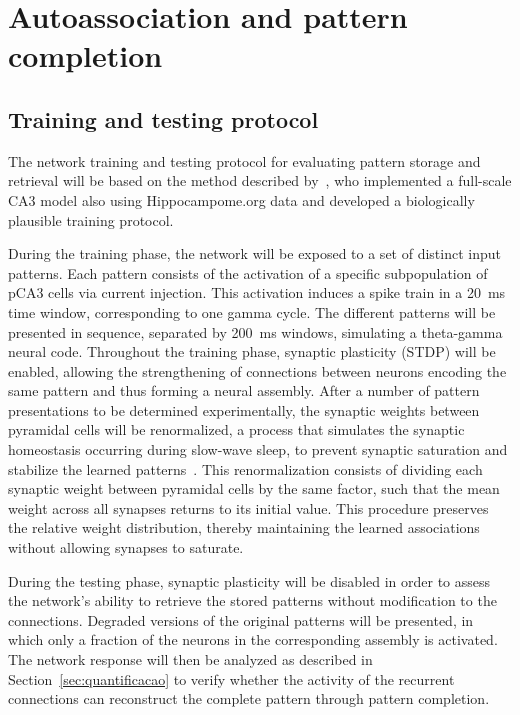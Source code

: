 \section{Autoassociation and pattern completion}

\subsection{Training and testing protocol}\label{sec:protocolo_treinamento_teste}

The network training and testing protocol for evaluating pattern storage and retrieval will be based on the method described
by~\textcite{kopsickFormation2024}, who implemented a full-scale CA3 model also using Hippocampome.org data and developed a
biologically plausible training protocol.

During the training phase, the network will be exposed to a set of distinct input patterns. Each pattern consists of the
activation of a specific subpopulation of pCA3 cells via current injection. This activation induces a spike train in a
\SI{20}{\milli\second} time window, corresponding to one gamma cycle. The different patterns will be presented in sequence,
separated by \SI{200}{\milli\second} windows, simulating a theta-gamma neural code. Throughout the training phase, synaptic
plasticity (STDP) will be enabled, allowing the strengthening of connections between neurons encoding the same pattern and thus
forming a neural assembly. After a number of pattern presentations to be determined experimentally, the synaptic weights between
pyramidal cells will be renormalized, a process that simulates the synaptic homeostasis occurring during slow-wave sleep, to
prevent synaptic saturation and stabilize the learned patterns~\parencite{gonzalez-ruedaActivityDependent2018, kopsickFormation2024}.
This renormalization consists of dividing each synaptic weight between pyramidal cells by the same factor, such that the mean
weight across all synapses returns to its initial value. This procedure preserves the relative weight distribution, thereby
maintaining the learned associations without allowing synapses to saturate.

During the testing phase, synaptic plasticity will be disabled in order to assess the network's ability to retrieve the stored
patterns without modification to the connections. Degraded versions of the original patterns will be presented, in which only a
fraction of the neurons in the corresponding assembly is activated. The network response will then be analyzed as described in
Section~\ref{sec:quantificacao} to verify whether the activity of the recurrent connections can reconstruct the complete
pattern through pattern completion.

